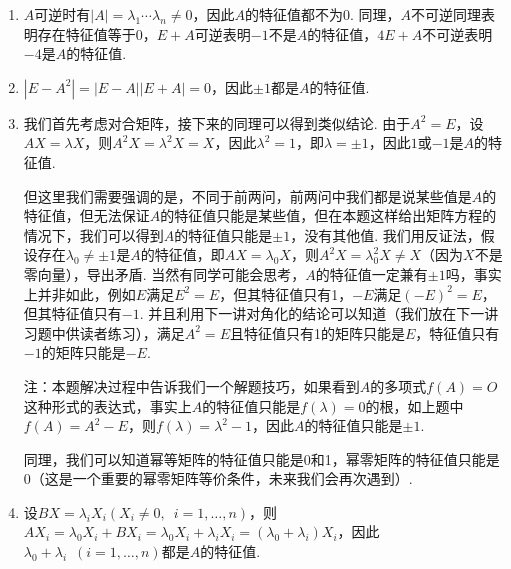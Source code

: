 \begin{solution}
    \begin{enumerate}
        \item $A$可逆时有$|A|=\lambda_1\cdots\lambda_n\neq 0$，因此$A$的特征值都不为0. 同理，$A$不可逆同理表明存在特征值等于0，$E+A$可逆表明$-1$不是$A$的特征值，$4E+A$不可逆表明$-4$是$A$的特征值.

        \item $|E-A^2|=|E-A||E+A|=0$，因此$\pm 1$都是$A$的特征值.

        \item 我们首先考虑对合矩阵，接下来的同理可以得到类似结论. 由于$A^2=E$，设$AX=\lambda X$，则$A^2X=\lambda^2X=X$，因此$\lambda^2=1$，即$\lambda=\pm 1$，因此$1$或$-1$是$A$的特征值.

              但这里我们需要强调的是，不同于前两问，前两问中我们都是说某些值是$A$的特征值，但无法保证$A$的特征值只能是某些值，但在本题这样给出矩阵方程的情况下，我们可以得到$A$的特征值只能是$\pm 1$，没有其他值. 我们用反证法，假设存在$\lambda_0\neq\pm 1$是$A$的特征值，即$AX=\lambda_0X$，则$A^2X=\lambda_0^2X\neq X$（因为$X$不是零向量），导出矛盾. 当然有同学可能会思考，$A$的特征值一定兼有$\pm 1$吗，事实上并非如此，例如$E$满足$E^2=E$，但其特征值只有1，$-E$满足$(-E)^2=E$，但其特征值只有$-1$. 并且利用下一讲对角化的结论可以知道（我们放在下一讲习题中供读者练习），满足$A^2=E$且特征值只有1的矩阵只能是$E$，特征值只有$-1$的矩阵只能是$-E$.

              注：本题解决过程中告诉我们一个解题技巧，如果看到$A$的多项式$f(A)=O$这种形式的表达式，事实上$A$的特征值只能是$f(\lambda)=0$的根，如上题中$f(A)=A^2-E$，则$f(\lambda)=\lambda^2-1$，因此$A$的特征值只能是$\pm 1$.

              同理，我们可以知道幂等矩阵的特征值只能是0和1，幂零矩阵的特征值只能是0（这是一个重要的幂零矩阵等价条件，未来我们会再次遇到）.

        \item 设$BX=\lambda_iX_i(X_i\neq 0,\enspace i=1,\ldots,n)$，则$AX_i=\lambda_0X_i+BX_i=\lambda_0X_i+\lambda_iX_i=(\lambda_0+\lambda_i)X_i$，因此$\lambda_0+\lambda_i\enspace(i=1,\ldots,n)$都是$A$的特征值.


\end{enumerate}
\end{solution}
